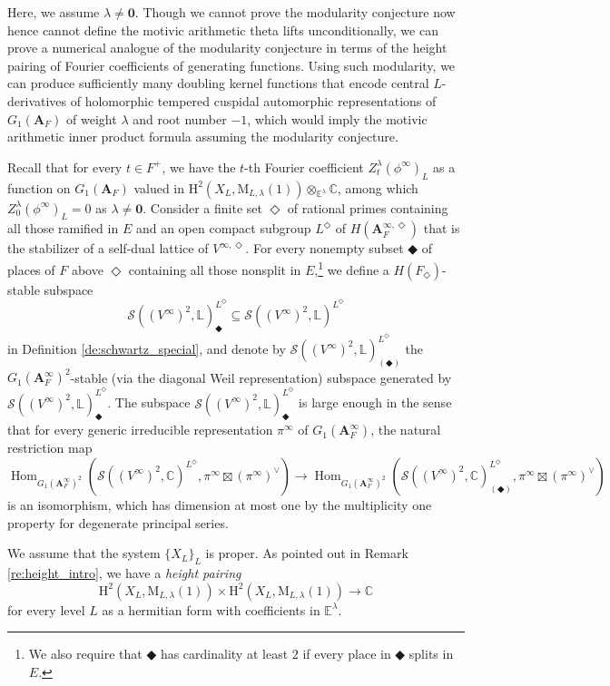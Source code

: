 \documentclass[12pt]{amsart}
\numberwithin{equation}{section}
\theoremstyle{plain}
\theoremstyle{definition}
\theoremstyle{remark}
\renewcommand{\b}[1]{\mathbf{#1}}
\renewcommand{\d}[1]{\mathbb{#1}}
\renewcommand{\r}[1]{\mathrm{#1}}
\newcommand{\s}[1]{\mathscr{#1}}
\renewcommand{\(}{\left(}
\renewcommand{\)}{\right)}
\newcommand{\bA}{\b A}
\newcommand{\dC}{\d C}
\newcommand{\dE}{\d E}
\newcommand{\dL}{\d L}
\newcommand{\rH}{\r H}
\newcommand{\rM}{\r M}
\newcommand{\sS}{\s S}
\DeclareMathOperator{\Hom}{Hom}
\begin{document}
Here, we assume $\lambda\neq\b{0}$. Though we cannot prove the modularity conjecture now hence cannot define the motivic arithmetic theta lifts unconditionally, we can prove a numerical analogue of the modularity conjecture in terms of the height pairing of Fourier coefficients of generating functions. Using such modularity, we can produce sufficiently many doubling kernel functions that encode central $L$-derivatives of holomorphic tempered cuspidal automorphic representations of $G_1(\bA_F)$ of weight $\lambda$ and root number $-1$, which would imply the motivic arithmetic inner product formula assuming the modularity conjecture.

Recall that for every $t\in F^+$, we have the $t$-th Fourier coefficient $Z^\lambda_t(\phi^\infty)_L$ as a function on $G_1(\bA_F)$ valued in $\rH^2(X_L,\rM_{L,\lambda}(1))\otimes_{\dE^\lambda}\dC$, among which $Z^\lambda_0(\phi^\infty)_L=0$ as $\lambda\neq\b{0}$. Consider a finite set $\Diamond$ of rational primes containing all those ramified in $E$ and an open compact subgroup $L^\Diamond$ of $H(\bA^{\infty,\Diamond}_F)$ that is the stabilizer of a self-dual lattice of $V^{\infty,\Diamond}$. For every nonempty subset $\Diamondblack$ of places of $F$ above $\Diamond$ containing all those nonsplit in $E$,\footnote{We also require that $\Diamondblack$ has cardinality at least $2$ if every place in $\Diamondblack$ splits in $E$.} we define a $H(F_\Diamond)$-stable subspace
\[
\sS((V^\infty)^2,\dL)^{L^\Diamond}_\Diamondblack\subseteq\sS((V^\infty)^2,\dL)^{L^\Diamond}
\]
in Definition \ref{de:schwartz_special}, and denote by $\sS((V^\infty)^2,\dL)^{L^\Diamond}_{(\Diamondblack)}$ the $G_1(\bA_F^\infty)^2$-stable (via the diagonal Weil representation) subspace generated by $\sS((V^\infty)^2,\dL)^{L^\Diamond}_\Diamondblack$. The subspace $\sS((V^\infty)^2,\dL)^{L^\Diamond}_\Diamondblack$ is large enough in the sense that for every generic irreducible representation $\pi^\infty$ of $G_1(\bA_F^\infty)$, the natural restriction map
\[
\Hom_{G_1(\bA_F^\infty)^2}\(\sS((V^\infty)^2,\dC)^{L^\Diamond},\pi^\infty\boxtimes(\pi^\infty)^\vee\)
\to
\Hom_{G_1(\bA_F^\infty)^2}\(\sS((V^\infty)^2,\dC)^{L^\Diamond}_{(\Diamondblack)},\pi^\infty\boxtimes(\pi^\infty)^\vee\)
\]
is an isomorphism, which has dimension at most one by the multiplicity one property for degenerate principal series.



We assume that the system $\{X_L\}_L$ is proper. As pointed out in Remark \ref{re:height_intro}, we have a \emph{height pairing}
\[
\rH^2(X_L,\rM_{L,\lambda}(1))\times \rH^2(X_L,\rM_{L,\lambda}(1))\to\dC
\]
for every level $L$ as a hermitian form with coefficients in $\dE^\lambda$.
\end{document}
